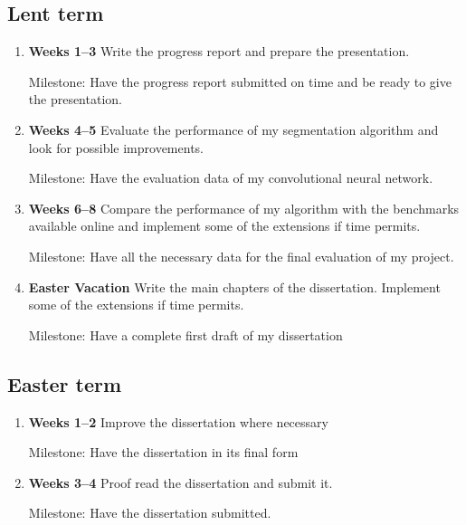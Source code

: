 \documentclass[12pt,a4paper,twoside]{article}
\begin{document}
\subsection*{Lent term}
\begin{enumerate}

\item \textbf{Weeks 1--3} Write the progress report and prepare the presentation.

{Milestone:} Have the progress report submitted on time and be ready to give the presentation.

\item \textbf{Weeks 4--5} Evaluate the performance of my segmentation algorithm and look for possible improvements.

{Milestone:} Have the evaluation data of my convolutional neural network.

\item \textbf{Weeks 6--8} Compare the performance of my algorithm with the benchmarks available online and implement some of the extensions if time permits.

{Milestone:} Have all the necessary data for the final evaluation of my project.

\item \textbf{Easter Vacation} Write the main chapters of the dissertation. Implement some of the extensions if time permits.

{Milestone:} Have a complete first draft of my dissertation

\end{enumerate}

\subsection*{Easter term}
\begin{enumerate}
\item \textbf{Weeks 1--2} Improve the dissertation where necessary

{Milestone:} Have the dissertation in its final form
\item \textbf{Weeks 3--4} Proof read the dissertation and submit it.

{Milestone:} Have the dissertation submitted.

\end{enumerate}
\end{document}
